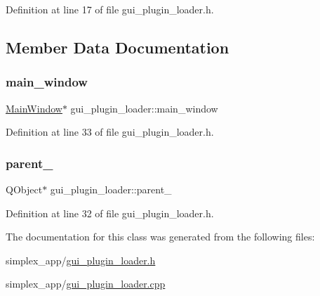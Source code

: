 Definition at line 17 of file gui\+\_\+plugin\+\_\+loader.\+h.



\subsection{Member Data Documentation}
\mbox{\label{classgui__plugin__loader_a1ff765127327eec72360c355a6255642}} 
\subsubsection{\texorpdfstring{main\+\_\+window}{main\_window}}
{\footnotesize\ttfamily \hyperlink{classMainWindow}{Main\+Window}$\ast$ gui\+\_\+plugin\+\_\+loader\+::main\+\_\+window\hspace{0.3cm}{\ttfamily [private]}}



Definition at line 33 of file gui\+\_\+plugin\+\_\+loader.\+h.

\mbox{\label{classgui__plugin__loader_a6bf4626d341c427f2c72a8b504dd2086}} 
\subsubsection{\texorpdfstring{parent\+\_\+}{parent\_}}
{\footnotesize\ttfamily Q\+Object$\ast$ gui\+\_\+plugin\+\_\+loader\+::parent\+\_\+\hspace{0.3cm}{\ttfamily [private]}}



Definition at line 32 of file gui\+\_\+plugin\+\_\+loader.\+h.



The documentation for this class was generated from the following files\+:\begin{DoxyCompactItemize}
\item 
simplex\+\_\+app/\hyperlink{gui__plugin__loader_8h}{gui\+\_\+plugin\+\_\+loader.\+h}\item 
simplex\+\_\+app/\hyperlink{gui__plugin__loader_8cpp}{gui\+\_\+plugin\+\_\+loader.\+cpp}\end{DoxyCompactItemize}
